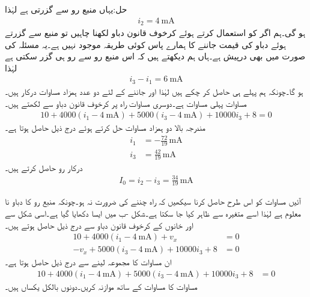 حل:یہاں  منبع رو سے گزرتی ہے لہٰذا
\begin{align*}
i_2=\SI{4}{\milli\ampere}
\end{align*}
ہو گی۔ہم اگر  کو استعمال کرتے ہوئے کرخوف قانون دباو لکھنا چاہیں تو  منبع سے گزرتے ہوئے دباو کی قیمت جاننے کا ہمارے پاس کوئی طریقہ موجود نہیں ہے۔یہ مسئلہ  کی صورت میں بھی درپیش ہے۔ہاں ہم دیکھتے ہیں کہ اس منبع رو سے  رو ہی گزر سکتی ہے لہٰذا
\begin{align}\label{مساوات_جوڑ_پہلی_ہمزاد_مساوات}
i_3-i_1=\SI{6}{\milli\ampere}
\end{align}
ہو گا۔چونکہ  ہم پہلے ہی حاصل کر چکے ہیں لہٰذا  اور  جاننے کے لئے دو عدد ہمزاد مساوات درکار ہیں۔مساوات  پہلی مساوات  ہے۔دوسری مساوات راہ  پر کرخوف قانون دباو سے لکھتے ہیں۔
\begin{align}\label{مساوات_جوڑ_مخلوط_خانہ_الف}
10+4000(i_1-\SI{4}{\milli\ampere})+5000(i_3-\SI{4}{\milli\ampere})+10000i_3+8=0
\end{align} 
مندرجہ بالا دو ہمزاد مساوات حل کرتے ہوئے درج ذیل حاصل ہوتا ہے۔
\begin{align*}
i_1&=-\frac{72}{19} \, \si{\milli\ampere}\\
i_3&=\frac{42}{19} \, \si{\milli\ampere}
\end{align*}
درکار رو حاصل کرتے ہیں۔
\begin{align*}
I_0=i_2-i_3=\frac{34}{19} \, \si{\milli\ampere}
\end{align*}

آئیں مساوات  کو اس طرح حاصل کرنا سیکھیں کہ راہ  چننے کی ضرورت نہ ہو۔چونکہ  منبع رو کا دباو نا معلوم ہے لہٰذا اسے  متغیرہ سے ظاہر کیا جا سکتا ہے۔شکل -ب میں ایسا دکھایا گیا ہے۔اسی شکل سے  اور  خانوں کے کرخوف قانون دباو سے درج ذیل حاصل ہوتے ہیں۔
\begin{align*}
10+4000(i_1-\SI{4}{\milli\ampere})+v_x&=0\\
-v_x+5000(i_3-\SI{4}{\milli\ampere})+10000i_3+8&=0
\end{align*}
ان مساوات کا مجموعہ لینے سے درج ذیل حاصل ہوتا ہے۔
\begin{align}\label{مساوات_جوڑ_مخلوط_خانہ_ب}
10+4000(i_1-\SI{4}{\milli\ampere})+5000(i_3-\SI{4}{\milli\ampere})+10000i_3+8&=0
\end{align}
مساوات  کا مساوات  کے ساتھ موازنہ کریں۔دونوں بالکل یکساں ہیں۔

